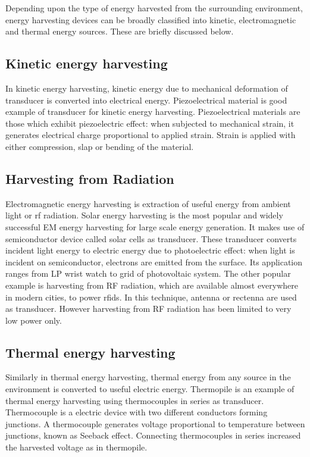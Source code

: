 \documentclass[12pt,a4paper,UKenglish]{report}
\begin{document}
Depending upon the type of energy harvested from the surrounding environment, energy harvesting devices can be 
broadly classified into kinetic, electromagnetic and thermal energy sources\cite{review_energy_harvest}. These are 
briefly discussed below.\\

\subsection{Kinetic energy harvesting}
In kinetic energy harvesting, kinetic energy due to mechanical deformation of transducer is converted into 
electrical energy. Piezoelectrical material is good example of transducer for kinetic energy harvesting. 
Piezoelectrical materials are those which exhibit piezoelectric effect: when subjected to mechanical strain, 
it generates electrical charge proportional to applied strain. Strain is applied with either compression, slap 
or bending of the material. \\

\subsection{Harvesting from Radiation}
Electromagnetic energy harvesting is extraction of useful energy from ambient light or \acrshort{rf} radiation. Solar energy 
harvesting is the most popular and widely successful EM energy harvesting for large scale energy generation. It 
makes use of semiconductor device called solar cells as transducer. These transducer converts incident light 
energy to electric energy due to photoelectric effect: when light is incident on semiconductor, electrons are 
emitted from the surface.  Its application ranges from LP wrist watch to grid of photovoltaic system. The other 
popular example is harvesting from  RF radiation, which are available almost everywhere in modern cities, to 
power \acrshort{rfid}s. In this technique, antenna or rectenna are used as transducer. However harvesting from RF radiation 
has been limited to very low power only. \\

\subsection{Thermal energy harvesting}
Similarly in thermal energy harvesting, thermal energy from any source in the environment is converted to useful 
electric energy. Thermopile is an example of thermal energy harvesting using thermocouples in series as 
transducer. Thermocouple is a electric device with two different conductors forming junctions. A thermocouple 
generates voltage proportional to temperature between junctions, known as Seeback effect. Connecting 
thermocouples in series increased the harvested voltage as in thermopile. \\
\end{document}
